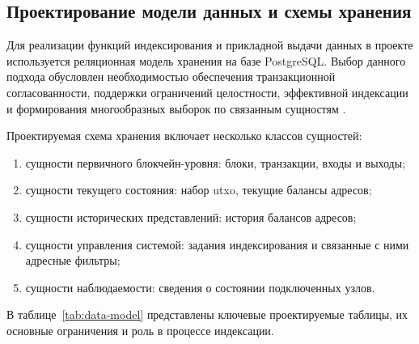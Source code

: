 ﻿\subsection{Проектирование модели данных и схемы хранения}

Для реализации функций индексирования и прикладной выдачи данных в проекте
используется реляционная модель хранения на базе PostgreSQL. Выбор данного
подхода обусловлен необходимостью обеспечения транзакционной согласованности,
поддержки ограничений целостности, эффективной индексации и формирования
многообразных выборок по связанным сущностям \cite{postgres_docs}.

Проектируемая схема хранения включает несколько классов сущностей:
\begin{enumerate}
    \item сущности первичного блокчейн-уровня: блоки, транзакции, входы и выходы;
    \item сущности текущего состояния: набор \gls{utxo}, текущие балансы адресов;
    \item сущности исторических представлений: история балансов адресов;
    \item сущности управления системой: задания индексирования и связанные с ними адресные фильтры;
    \item сущности наблюдаемости: сведения о состоянии подключенных узлов.
\end{enumerate}

В таблице~\ref{tab:data-model} представлены ключевые проектируемые таблицы,
их основные ограничения и роль в процессе индексации.


